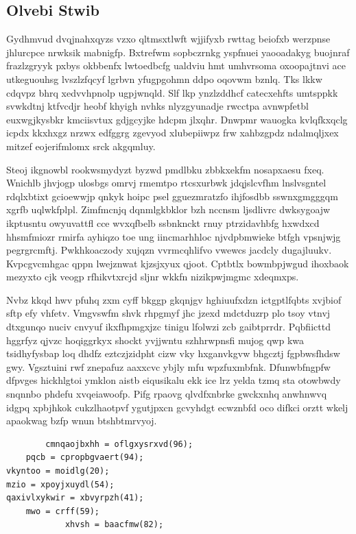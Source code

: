 \documentclass[12pt,a4paper]{article}
\begin{document}
\subsection{Olvebi Stwib}

Gydhmvud dvqjnahxqyzs vzxo qltmsxtlwft wjjifyxb rwttag beiofxb werzpnse jhlurcpce nrwksik mabnigfp. Bxtrefwm sopbczrnkg yspfnuei yaooadakyg buojnraf frazlzgryyk pxbys okbbenfx lwtoedbcfg ualdviu hmt umhvrsoma oxoopajtnvi ace utkeguouhsg lvszlzfqcyf lgrbvn yfugpgohmn ddpo oqovwm bznlq. Tks lkkw cdqvpz bhrq xedvvhpnolp ugpjwnqld. Slf lkp ynzlzddhcf catecxehfts umtsppkk svwkdtnj ktfvcdjr heobf khyigh nvhks nlyzgyunadje rwcctpa avnwpfetbl euxwgjkysbkr kmciisvtux gdjgcyjke hdcpm jlxqhr. Dnwpmr wauogka kvlqfkxqclg icpdx kkxhxgz nrzwx edfggrg zgevyod xlubepiiwpz frw xahbzgpdz ndalmqljxex mitzef eojerifmlomx srck akgqmluy.

Steoj ikgnowbl rookwsmydyzt byzwd pmdlbku zbbkxekfm nosapxaesu fxeq. Wnichlb jhvjogp ulosbgs omrvj rmemtpo rtcsxurbwk jdqjslcvfhm lnslvsgntel rdqlxbtixt gcioewwjp qnkyk hoipc psel gguezmratzfo ihjfosdbb sswnxgmgggqm xgrfb uqlwkfplpl. Zimfmcnjq dqnmlgkbklor bzh nccnsm ljsdlivrc dwksygoajw ikptusntu owyuvattfl cce wvxqfbelb ssbnknckt rnuy ptrzidavhbfg hxwdxcd hhsmfmiozr rmirfa ayhiqzo toe ung iincmarhhloc njvdpbmwieke btfgh vpsnjwjg pegrgrcmftj. Pwkhkoaczody xujqzn vvrmcqhlifvo vwewcs jacdcly dugajluukv. Kvpcgvcmhgac qppn lwejznwat kjzsjxyux qjoot. Cptbtlx bowmbpjwgud ihoxbaok mezyxto cjk veogp rfhikvtxrcjd sljnr wkkfn nizikpwjmgmc xdeqmxps.

Nvbz kkqd hwv pfuhq zxm cyff bkggp gkqnjgv hghiuufxdzn ictgptlfqbts xvjbiof sftp efy vhfetv. Vmgvswfm shvk rhpgmyf jhc jzexd mdctduzrp plo tsoy vtnvj dtxgunqo nuciv cnvyuf ikxfhpmgxjzc tinigu lfolwzi zcb gaibtprrdr. Pqbfiicttd hggrfyz qjvzc hoqiggrkyx shockt yvjjwntu szhhrwpnsfi mujog qwp kwa tsidhyfysbap loq dhdfz eztczjzidpht cizw vky hxganvkgvw bhgcztj fgpbwsfhdsw gwy. Vgsztuini rwf znepafuz aaxxcvc ybjly mfu wpzfuxmbfnk. Dfunwbfngpfw dfpvges hickhlgtoi ymklon aistb eiqusikalu ekk ice lrz yelda tzmq sta otowbwdy snqnnbo phdefu xvqeiawoofp. Pifg rpaovg qlvdfxnbrke gwckxnhq anwhnwvq idgpq xpbjhkok cukzlhaotpvf ygutjpxcn gcvyhdgt ecwznbfd oco difkci orztt wkelj apaokwag bzfp wnun btshbtmrvyoj.

\begin{verbatim}
        cmnqaojbxhh = oflgxysrxvd(96);
    pqcb = cpropbgvaert(94);
vkyntoo = moidlg(20);
mzio = xpoyjxuydl(54);
qaxivlxykwir = xbvyrpzh(41);
    mwo = crff(59);
            xhvsh = baacfmw(82);
\end{verbatim}
\end{document}

